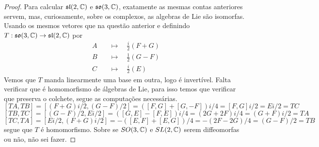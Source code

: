 \begin{exercise}
    \label{prob:l3:5}
\end{exercise}
\begin{proof}
    Para calcular $\mathfrak{sl}(2,\mathbb{C})$ e $\mathfrak{so}(3,\mathbb{C})$, exatamente as mesmas contas anteriores servem, mas,
    curiosamente, sobre os complexos, as algebras de Lie são isomorfas. Usando os mesmos vetores que na questão anterior
    e definindo $T:\mathfrak{so}(3,\mathbb{C}) \rightarrow \mathfrak{sl}(2,\mathbb{C})$ por 
    \begin{align*}
        A \quad &\mapsto \quad \frac{i}{2}(F + G)\\
        B \quad &\mapsto \quad \frac{1}{2}(G - F)\\
        C \quad &\mapsto \quad \frac{i}{2}(E)
    \end{align*}
    Vemos que $T$ manda linearmente uma base em outra, logo é invertível. Falta verificar que é homomorfismo de álgebras de Lie,
    para isso temos que verificar que preserva o colchete, segue as computações necessárias. 
    $$[TA, TB] = [(F + G)i/2, (G - F)/2] = ([F,G] + [G,-F])i/4 = [F,G]i/2 = Ei/2 = TC$$
    $$[TB, TC] = [(G - F)/2, Ei/2] = ([G,E] - [F,E])i/4 = (2G + 2F)i/4 = (G + F)i/2 = TA$$
    $$[TC, TA] = [Ei/2, (F + G)i/2] = -([E,F] + [E,G])/4 = -(2F - 2G)/4 = (G - F)/2 = TB$$
    segue que $T$ é homomorfismo. Sobre se $SO(3,\mathbb{C})$ e $SL(2,\mathbb{C})$ serem diffeomorfas ou não, não 
    sei fazer. 
\end{proof}

